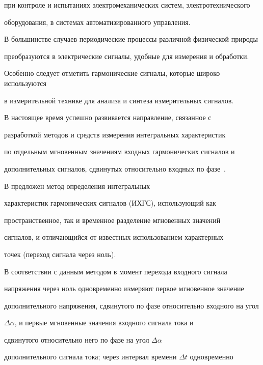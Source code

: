 при контроле и испытаниях электромеханических систем, электротехнического

оборудования, в системах автоматизированного управления.





В большинстве случаев периодические процессы различной физической природы

преобразуются в электрические сигналы, удобные для измерения и обработки.







Особенно следует отметить гармонические сигналы, которые широко используются

в измерительной технике для анализа и синтеза измерительных сигналов.



В настоящее время успешно развивается направление, связанное с

разработкой методов и средств измерения интегральных характеристик

по отдельным мгновенным значениям входных гармонических сигналов и

дополнительных сигналов, сдвинутых относительно входных по фазе~\cite{melen:bib1}.







В \cite{melen:bib2} предложен метод определения интегральных

характеристик гармонических сигналов (ИХГС), использующий как

пространственное, так и временное разделение мгновенных значений

сигналов, и отличающийся от известных использованием характерных

точек (переход сигнала через ноль).



В соответствии с данным методом в момент перехода входного сигнала

напряжения через ноль одновременно измеряют первое мгновенное значение

дополнительного напряжения, сдвинутого по фазе относительно входного на угол

$\Delta \alpha $, и первые мгновенные значения входного сигнала тока и

сдвинутого относительно него по фазе на угол $\Delta \alpha $

дополнительного сигнала тока; через интервал времени $\Delta t$ одновременно

